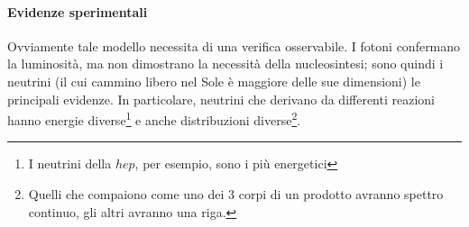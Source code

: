 \paragraph{Evidenze sperimentali} Ovviamente tale modello necessita di una verifica osservabile. I fotoni confermano la luminosità, ma non dimostrano la necessità della nucleosintesi; sono quindi i neutrini (il cui cammino libero nel Sole è maggiore delle sue dimensioni) le principali evidenze. In particolare, neutrini che derivano da differenti reazioni hanno energie diverse\footnote{I neutrini della $hep$, per esempio, sono i più energetici} e anche distribuzioni diverse\footnote{Quelli che compaiono come uno dei 3 corpi di un prodotto avranno spettro continuo, gli altri avranno una riga.}. 


